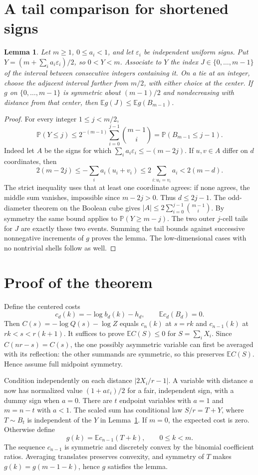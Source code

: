 \documentclass[11pt]{article}
\newtheorem{lemma}[theorem]{Lemma}
\newcommand{\E}{\mathbb E}
\newcommand{\Prb}{\mathbb P}
\begin{document}
\section{A tail comparison for shortened signs}
\begin{lemma}\label{lem:tail}
Let $m\ge1$, $0\le a_i<1$, and let $\varepsilon_i$ be independent uniform
signs. Put $Y=(m+\sum_i a_i\varepsilon_i)/2$, so $0<Y<m$.
Associate to $Y$ the index $J\in\{0,\ldots,m-1\}$ of the interval
between consecutive integers containing it. On a tie at an integer,
choose the adjacent interval farther from $m/2$, with either choice at the
center. If $g$ on $\{0,\ldots,m-1\}$ is symmetric about $(m-1)/2$ and
nondecreasing with distance from that center, then $\E g(J)\le \E g(B_{m-1})$.
\end{lemma}
\begin{proof}
For every integer $1\le j<m/2$,
\[
 \Prb(Y\le j)\le 2^{-(m-1)}\sum_{i=0}^{j-1}\binom{m-1}i
 =\Prb(B_{m-1}\le j-1).
\]
Indeed let $A$ be the signs for which $\sum_i a_i\varepsilon_i\le -(m-2j)$.
If $u,v\in A$ differ on $d$ coordinates, then
\[
 2(m-2j)\le-\sum_i a_i(u_i+v_i)
 \le 2\sum_{i:u_i=v_i}a_i < 2(m-d).
\]
The strict inequality uses that at least one coordinate agrees:
if none agrees, the middle sum vanishes, impossible since $m-2j>0$.
Thus $d\le 2j-1$. The odd-diameter theorem on the Boolean cube
\cite[Theorem 1.1]{HKP} gives $|A|\le2\sum_{i=0}^{j-1}\binom{m-1}i$.
By symmetry the same bound applies to $\Prb(Y\ge m-j)$.
The two outer $j$-cell tails for $J$ are exactly these two events. Summing
the tail bounds against successive nonnegative increments of $g$ proves
the lemma. The low-dimensional cases with no nontrivial shells follow as well.
\end{proof}

\section{Proof of the theorem}
Define the centered costs
\[
 c_d(k)=-\log b_d(k)-h_d,\qquad \E c_d(B_d)=0.
\]
Then $C(s)=-\log Q(s)-\log Z$ equals $c_n(k)$ at $s=rk$ and
$c_{n-1}(k)$ at $rk<s<r(k+1)$. It suffices to prove $\E C(S)\le0$ for
$S=\sum_i X_i$. Since $C(nr-s)=C(s)$, the one possibly asymmetric
variable can first be averaged with its reflection: the other summands
are symmetric, so this preserves $\E C(S)$. Hence assume full midpoint
symmetry.

Condition independently on each distance $|2X_i/r-1|$. A variable
with distance $a$ now has normalized value $(1+a\varepsilon_i)/2$ for a
fair, independent sign, with a dummy sign when $a=0$. There are $t$
endpoint variables with $a=1$ and $m=n-t$ with $a<1$.
The scaled sum has conditional law $S/r=T+Y$, where $T\sim B_t$ is
independent of the $Y$ in Lemma~\ref{lem:tail}. If $m=0$, the expected
cost is zero. Otherwise define
\[
 g(k)=\E c_{n-1}(T+k),\qquad 0\le k<m.
\]
The sequence $c_{n-1}$ is symmetric and discretely convex by the
binomial coefficient ratios. Averaging translates preserves convexity,
and symmetry of $T$ makes $g(k)=g(m-1-k)$, hence $g$ satisfies the lemma.
\end{document}

